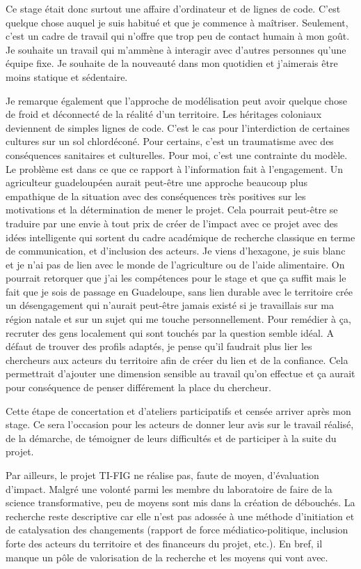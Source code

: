 Ce stage était donc surtout une affaire d'ordinateur et de lignes de code. C'est quelque chose auquel je suis 
habitué et que je commence à maîtriser. Seulement, c'est un cadre de travail qui n'offre que trop peu de 
contact humain à mon goût. Je souhaite un travail qui m'ammène à interagir avec d'autres personnes qu'une équipe fixe.
Je souhaite de la nouveauté dans mon quotidien et j'aimerais être moins statique et sédentaire.

Je remarque également que l'approche de modélisation peut avoir quelque chose de froid et déconnecté 
de la réalité d'un territoire. Les héritages coloniaux deviennent de simples lignes de code. 
C'est le cas pour l'interdiction de certaines cultures sur un sol chlordéconé. Pour certains, 
c'est un traumatisme avec des conséquences sanitaires et culturelles. Pour moi, c'est une 
contrainte du modèle. 
Le problème est dans ce que ce rapport à l'information fait à l'engagement. Un agriculteur 
guadeloupéen aurait peut-être une approche beaucoup plus empathique de la situation avec 
des conséquences très positives sur les motivations et la détermination de mener le projet. 
Cela pourrait peut-être se traduire par une envie à tout prix de créer de l'impact avec ce projet
avec des idées intelligente qui sortent du cadre académique de recherche classique en terme de 
communication, et d'inclusion des acteurs.
Je viens d'hexagone, je suis blanc et je n'ai pas de lien avec le monde de l'agriculture ou de l'aide alimentaire.
On pourrait retorquer que j'ai les compétences pour le stage et que ça suffit mais le fait 
que je sois de passage en Guadeloupe, sans lien durable avec le territoire crée un désengagement 
qui n'aurait peut-être jamais existé si je travaillais sur ma région natale et sur un sujet qui 
me touche personnellement.
Pour remédier à ça, recruter des gens localement qui sont touchés par la question semble idéal.
A défaut de trouver des profils adaptés, je pense 
qu'il faudrait plus lier les chercheurs aux acteurs du territoire afin de créer du lien et de 
la confiance. Cela permettrait d'ajouter une dimension sensible au travail qu'on effectue et ça 
aurait pour conséquence de penser différement la place du chercheur.

Cette étape de concertation et d'ateliers participatifs et censée arriver après mon stage. Ce 
sera l'occasion pour les acteurs de donner leur avis sur le travail réalisé, de la démarche, de 
témoigner de leurs difficultés et de participer à la suite du projet.

Par ailleurs, le projet TI-FIG ne réalise pas, faute de moyen, d'évaluation d'impact. 
Malgré une volonté parmi les membre du laboratoire de faire de la science transformative, peu 
de moyens sont mis dans la création de débouchés. La recherche reste descriptive car elle n'est 
pas adossée à une méthode d'initiation et de catalysation des changements (rapport de force 
médiatico-politique, inclusion forte des acteurs du territoire et des financeurs du projet, etc.).
En bref, il manque un pôle de valorisation de la recherche et les moyens qui vont avec.

